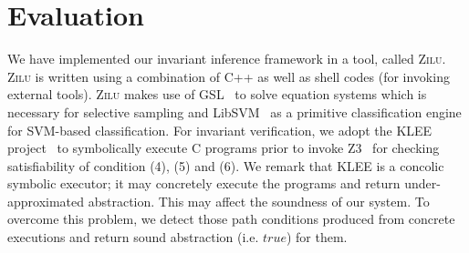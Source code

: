 
\section{Evaluation} %
\label{sec:evaluations}
We have implemented our invariant inference framework in a tool, called \textsc{Zilu}. \textsc{Zilu} is written using a combination of C++ as well as shell codes (for invoking external tools).
\textsc{Zilu} makes use of GSL~\cite{gough2009gnu} to solve equation systems which is necessary for selective sampling and
 LibSVM~\cite{chang2011libsvm} as a primitive classification engine for
SVM-based classification. %
For invariant verification, we %
adopt the KLEE project~\cite{cadar2008klee} to
symbolically execute
 C programs %
prior to invoke Z3~\cite{de2008z3} for checking satisfiability of
condition (4), (5) and (6).
 We remark that KLEE is a concolic symbolic executor; it may
concretely execute the programs and return
 under-approximated
abstraction. This may affect the soundness of our system.
To overcome this problem, we detect those path conditions produced from
concrete executions
and return sound abstraction (i.e. $true$) for them.

